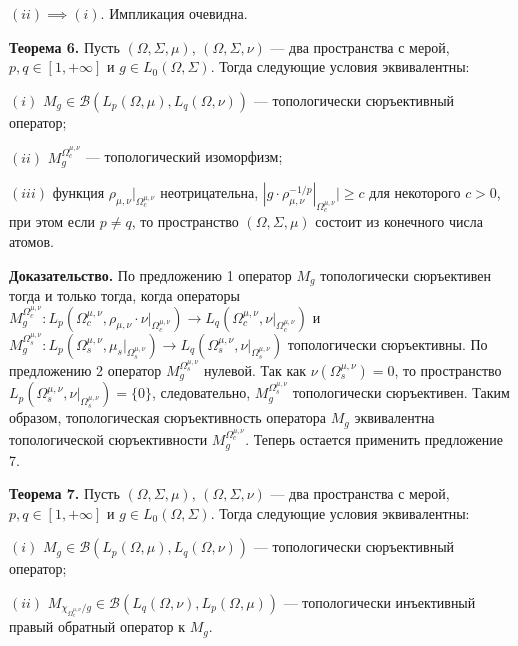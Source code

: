 \documentclass[11pt,twoside]{article}
\begin{document}
    $(ii)$$\implies$$ (i)$. Импликация очевидна.


        \textbf{Теорема 6.} Пусть $(\Omega,\Sigma,\mu)$, $(\Omega,\Sigma,\nu)$
        --- два пространства с мерой, $p,q\in[1,+\infty]$ и $g\in
    L_0(\Omega,\Sigma)$. Тогда следующие условия эквивалентны:

    $(i)$ $M_g\in\mathcal{B}(L_p(\Omega,\mu), L_q(\Omega,\nu))$ ---
        топологически сюръективный оператор;

    $(ii)$ $M_g^{\Omega_c^{\mu,\nu}}$ --- топологический изоморфизм;

    $(iii)$ функция $\rho_{\mu,\nu}|_{\Omega_c^{\mu,\nu}}$ неотрицательна,
    $|g\cdot\rho_{\mu,\nu}^{-1/p}|_{\Omega_c^{\mu,\nu}}|\geq c$ для некоторого
    $c>0$, при этом если $p\neq q$, то пространство $(\Omega,\Sigma,\mu)$
        состоит из конечного числа атомов.

        \textbf{Доказательство.} По предложению 1 оператор $M_g$ топологически
        сюръективен тогда и только тогда, когда операторы
    $M_g^{\Omega_c^{\mu,\nu}}:
    L_p(\Omega_c^{\mu,\nu},\rho_{\mu,\nu}\cdot\nu|_{\Omega_c^{\mu,\nu}})
    \to
    L_q(\Omega_c^{\mu,\nu},\nu|_{\Omega_c^{\mu,\nu}})$ и
    $M_g^{\Omega_s^{\mu,\nu}}:
    L_p(\Omega_s^{\mu,\nu},\mu_s|_{\Omega_s^{\mu,\nu}})
    \to
    L_q(\Omega_s^{\mu,\nu},\nu|_{\Omega_s^{\mu,\nu}})$ топологически
        сюръективны. По предложению 2 оператор $M_g^{\Omega_s^{\mu,\nu}}$
        нулевой. Так как $\nu(\Omega_s^{\mu,\nu})=0$, то пространство
    $L_p(\Omega_s^{\mu,\nu},\nu|_{\Omega_s^{\mu,\nu}})=\{0\}$,
        следовательно, $M_g^{\Omega_s^{\mu,\nu}}$ топологически сюръективен.
        Таким образом, топологическая сюръективность оператора $M_g$
        эквивалентна топологической сюръективности  $M_g^{\Omega_c^{\mu,\nu}}$.
        Теперь остается применить предложение 7.


        \textbf{Теорема 7.} Пусть $(\Omega,\Sigma,\mu)$, $(\Omega,\Sigma,\nu)$
        --- два пространства с мерой, $p,q\in[1,+\infty]$ и $g\in
    L_0(\Omega,\Sigma)$. Тогда следующие условия эквивалентны:

    $(i)$ $M_g\in\mathcal{B}(L_p(\Omega,\mu),L_q(\Omega,\nu))$ --- топологически
        сюръективный оператор;

    $(ii)$ $M_{\chi_{\Omega_c^{\mu,\nu}}/g}\in\mathcal{B}(L_q(\Omega,\nu),
    L_p(\Omega,\mu))$ --- топологически инъективный правый обратный оператор к
    $M_g$.
\end{document}
